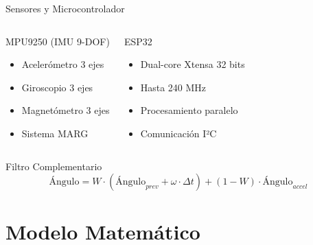 \documentclass[10pt,xcolor={dvipsnames}]{beamer}
\begin{document}
\begin{frame}{Sensores y Microcontrolador}
\begin{columns}
\begin{block}{MPU9250 (IMU 9-DOF)}
\begin{itemize}
    \item Acelerómetro 3 ejes
    \item Giroscopio 3 ejes
    \item Magnetómetro 3 ejes
    \item Sistema MARG
\end{itemize}
\end{block}

\vspace{0.2cm}

\begin{block}{ESP32}
\begin{itemize}
    \item Dual-core Xtensa 32 bits
    \item Hasta 240 MHz
    \item Procesamiento paralelo
    \item Comunicación I²C
\end{itemize}
\end{block}

\vspace{0.2cm}
\end{columns}

\vspace{0.3cm}
\begin{alertblock}{Filtro Complementario}
\begin{equation*}
\text{Ángulo} = W \cdot (\text{Ángulo}_{prev} + \omega \cdot \Delta t) + (1-W) \cdot \text{Ángulo}_{accel}
\end{equation*}
\end{alertblock}
\end{frame}

\section{Modelo Matemático}
\end{document}
